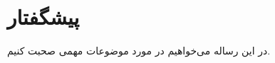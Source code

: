 \thispagestyle{empty}

\chapter*{پیشگفتار}
{}

در این رساله می‌خواهیم در مورد موضوعات مهمی صحبت کنیم.